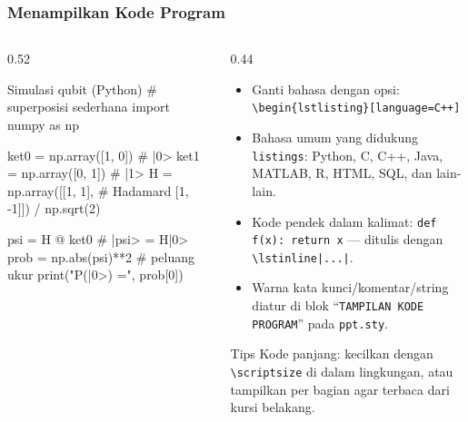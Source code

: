 \begin{frame}[fragile]
  \frametitle{Menampilkan Kode Program}

  \begin{columns}[T]
    \begin{column}{0.52\textwidth}
      \begin{pptcode}{Simulasi qubit (Python)}
# superposisi sederhana
import numpy as np

ket0 = np.array([1, 0])   # |0>
ket1 = np.array([0, 1])   # |1>
H = np.array([[1,  1],    # Hadamard
              [1, -1]]) / np.sqrt(2)

psi = H @ ket0            # |psi> = H|0>
prob = np.abs(psi)**2     # peluang ukur
print("P(|0>) =", prob[0])
      \end{pptcode}
    \end{column}
    \hfill
    \begin{column}{0.44\textwidth}
      \begin{itemize}
        \item Ganti bahasa dengan opsi:
              \texttt{\textbackslash begin\{lstlisting\}[language=C++]}
        \item Bahasa umum yang didukung \texttt{listings}: Python, C, C++, Java,
              MATLAB, R, HTML, SQL, dan lain-lain.
        \item Kode pendek dalam kalimat:
              \lstinline|def f(x): return x| ---
              ditulis dengan \texttt{\textbackslash lstinline|...|}.
        \item Warna kata kunci/komentar/string diatur di blok
              ``\texttt{TAMPILAN KODE PROGRAM}'' pada \texttt{ppt.sty}.
      \end{itemize}
      \begin{alertblock}{Tips}
        Kode panjang: kecilkan dengan \texttt{\textbackslash scriptsize} di dalam
        lingkungan, atau tampilkan per bagian agar terbaca dari kursi belakang.
      \end{alertblock}
    \end{column}
  \end{columns}
\end{frame}

